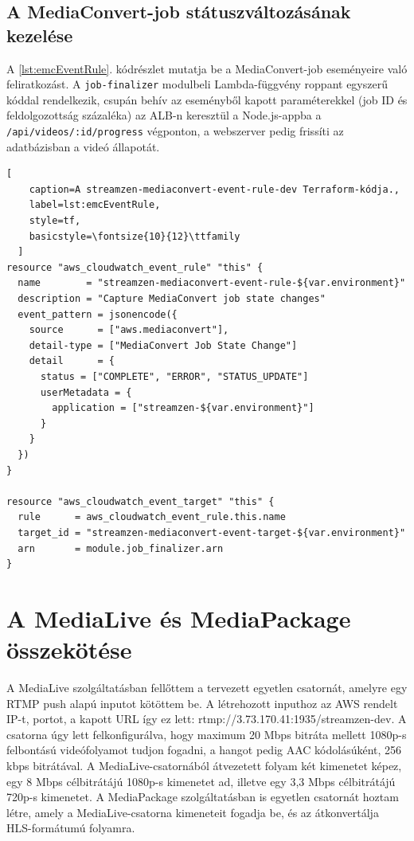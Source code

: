 \subsection{A MediaConvert-job státuszváltozásának kezelése}

A \ref{lst:emcEventRule}. kódrészlet mutatja be a MediaConvert-job eseményeire való feliratkozást. A \verb|job-finalizer| modulbeli Lambda-függvény roppant egyszerű kóddal rendelkezik, csupán behív az eseményből kapott paraméterekkel (job ID és feldolgozottság százaléka) az ALB-n keresztül a Node.js-appba a \verb|/api/videos/:id/progress| végponton, a webszerver pedig frissíti az adatbázisban a videó állapotát.

\begin{minipage}{0.92\textwidth}
  \begin{lstlisting}[
    caption=A streamzen-mediaconvert-event-rule-dev Terraform-kódja.,
    label=lst:emcEventRule,
    style=tf,
    basicstyle=\fontsize{10}{12}\ttfamily
  ]
resource "aws_cloudwatch_event_rule" "this" {
  name        = "streamzen-mediaconvert-event-rule-${var.environment}"
  description = "Capture MediaConvert job state changes"
  event_pattern = jsonencode({
    source      = ["aws.mediaconvert"],
    detail-type = ["MediaConvert Job State Change"]
    detail      = {
      status = ["COMPLETE", "ERROR", "STATUS_UPDATE"]
      userMetadata = {
        application = ["streamzen-${var.environment}"]
      }
    }
  })
}

resource "aws_cloudwatch_event_target" "this" {
  rule      = aws_cloudwatch_event_rule.this.name
  target_id = "streamzen-mediaconvert-event-target-${var.environment}"
  arn       = module.job_finalizer.arn
}
\end{lstlisting}
\end{minipage}

\section{A MediaLive és MediaPackage összekötése}

A MediaLive szolgáltatásban fellőttem a tervezett egyetlen csatornát, amelyre egy RTMP push alapú inputot kötöttem be. A létrehozott inputhoz az AWS rendelt IP-t, portot, a kapott URL így ez lett: rtmp://3.73.170.41:1935/streamzen-dev. A csatorna úgy lett felkonfigurálva, hogy maximum 20 Mbps bitráta mellett 1080p-s felbontású videófolyamot tudjon fogadni, a hangot pedig AAC kódolásúként, 256 kbps bitrátával. A MediaLive-csatornából átvezetett folyam két kimenetet képez, egy 8 Mbps célbitrátájú 1080p-s kimenetet ad, illetve egy 3,3 Mbps célbitrátájú 720p-s kimenetet. A MediaPackage szolgáltatásban is egyetlen csatornát hoztam létre, amely a MediaLive-csatorna kimeneteit fogadja be, és az átkonvertálja HLS-formátumú folyamra.

